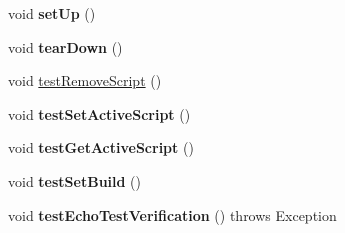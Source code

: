 \begin{DoxyCompactItemize}
\item 
\hypertarget{class_c_a_s_u_a_l_1_1caspac_1_1_caspac_test_a6b7a7de2245a1ada8fa98a3b01bfd381}{void {\bfseries set\-Up} ()}\label{class_c_a_s_u_a_l_1_1caspac_1_1_caspac_test_a6b7a7de2245a1ada8fa98a3b01bfd381}

\item 
\hypertarget{class_c_a_s_u_a_l_1_1caspac_1_1_caspac_test_a99c80cb032c5c3d1eab471503f4d448c}{void {\bfseries tear\-Down} ()}\label{class_c_a_s_u_a_l_1_1caspac_1_1_caspac_test_a99c80cb032c5c3d1eab471503f4d448c}

\item 
void \hyperlink{class_c_a_s_u_a_l_1_1caspac_1_1_caspac_test_aaf1801c0e6b7492e34fae5e25a83f23c}{test\-Remove\-Script} ()
\item 
\hypertarget{class_c_a_s_u_a_l_1_1caspac_1_1_caspac_test_a056dc6cee1499f32fbc4dcde14c62557}{void {\bfseries test\-Set\-Active\-Script} ()}\label{class_c_a_s_u_a_l_1_1caspac_1_1_caspac_test_a056dc6cee1499f32fbc4dcde14c62557}

\item 
\hypertarget{class_c_a_s_u_a_l_1_1caspac_1_1_caspac_test_a4c2e5ad8b61d73f007534b58e1e80b54}{void {\bfseries test\-Get\-Active\-Script} ()}\label{class_c_a_s_u_a_l_1_1caspac_1_1_caspac_test_a4c2e5ad8b61d73f007534b58e1e80b54}

\item 
\hypertarget{class_c_a_s_u_a_l_1_1caspac_1_1_caspac_test_a7cbc2c75a5df1d2792affaa740f95e3f}{void {\bfseries test\-Set\-Build} ()}\label{class_c_a_s_u_a_l_1_1caspac_1_1_caspac_test_a7cbc2c75a5df1d2792affaa740f95e3f}

\item 
\hypertarget{class_c_a_s_u_a_l_1_1caspac_1_1_caspac_test_abe5ea7f10efe1f33733f9c43a8629864}{void {\bfseries test\-Echo\-Test\-Verification} ()  throws Exception }\label{class_c_a_s_u_a_l_1_1caspac_1_1_caspac_test_abe5ea7f10efe1f33733f9c43a8629864}

\end{DoxyCompactItemize}
